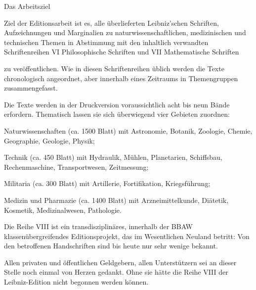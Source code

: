 Das Arbeitsziel\par\vspace{1.0ex}
Ziel der Editionsarbeit ist es, alle \"{u}berlieferten Leibniz'schen Schriften, Auf\-zeichnungen und Marginalien zu naturwissenschaftlichen, medizinischen und tech\-nischen Themen in Abstimmung mit den inhaltlich verwandten Schriftenreihen VI Philosophische Schriften und VII Mathematische Schriften\rule[-5mm]{0mm}{0mm} zu ver\"{o}ffent\-lichen. Wie in diesen Schriftenreihen \"{u}blich werden die Texte chronologisch angeordnet, aber innerhalb eines Zeitraums in Themengruppen zusammengefasst.\par
Die Texte werden in der Druckversion voraussichtlich acht bis neun B\"{a}nde erfordern. Thematisch lassen sie sich \"{u}berwiegend vier Gebieten zuordnen:
\begin{list}{.\hfill}{%
   \setlength{\labelwidth}{3mm}
   \setlength{\labelsep}{1mm}
   \setlength{\itemindent}{5mm}
   \setlength{\leftmargin}{0cm}
   \setlength{\itemsep}{-0.5ex}}
\item Naturwissenschaften (ca. 1500 Blatt) mit Astronomie, Botanik, Zoologie, Chemie, Geographie, Geologie, Physik;
\item Technik (ca. 450 Blatt) mit Hydraulik, M\"{u}hlen, Planetarien, Schiffsbau, Rechenmaschine, Transportwesen, Zeitmessung;
\item Militaria (ca. 300 Blatt) mit Artillerie, Fortifikation, Kriegsf\"{u}hrung;
\item Medizin und Pharmazie (ca. 1400 Blatt) mit Arzneimittelkunde, Di\"{a}tetik, Kosmetik, Medizinalwesen, Pathologie.
\end{list}
Die Reihe VIII ist ein transdisziplin\"{a}res, innerhalb der BBAW klassen\"{u}bergreifendes Editionsprojekt, das im Wesentlichen Neuland betritt: Von den betroffenen Handschriften sind bis heute nur sehr wenige bekannt.\par
Allen privaten und \"{o}ffentlichen Geldgebern, allen Unterst\"{u}tzern sei an dieser Stelle noch einmal von Herzen gedankt. Ohne sie h\"{a}tte die Reihe VIII der Leibniz-Edition nicht begonnen werden k\"{o}nnen.
